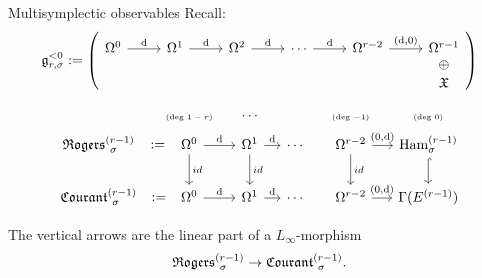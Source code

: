 \documentclass[beamer,10pt]{standalone}
\begin{document}
\begin{frame}{Multisymplectic observables}
	Recall:
	\begin{displaymath}
		\g_{r,\sigma}^{<0} := \left(
		\begin{tikzcd}[ampersand replacement=\&]
			\Omega^0 \ar[r,"\d"]\&
			\Omega^1 \ar[r,"\d"]\&
			\Omega^2 \ar[r,"\d"]\&
			\cdots \ar[r,"\d"]\&
			\Omega^{r-2} \ar[r,"{(\d,0)}"]\&
			\Omega^{r-1}\ar[d,phantom,"\oplus"]\\[-.7em]
			\&\&\&\&\&\X
 		\end{tikzcd}
		\right)
	\end{displaymath}
	\vfill\pause

	\begin{displaymath}
		\begin{tikzcd}[ampersand replacement=\&,column sep = small]
			\& \text{\tiny (deg $1-r$)} \& \cdots \& \&\text{\tiny (deg $-1$)} \& \text{\tiny (deg $0$)} \\[-1.5em]
			\Rogers[\sigma]{r-1}   \ar[r,phantom,":="]
			\&
			\Omega^0 \ar[r,"{\d}"] \ar[d,"id"]
			\&
			\Omega^1 \ar[r,"{\d}"] \ar[d,"id"]
			\&
			\cdots
			\&
			\Omega^{r-2} \ar[r,"{(0,\d)}"] \ar[d,"id"]
			\& \Ham_{\sigma}^{(r-1)} \ar[d,hook]
			\\
			\Courant[\sigma]{r-1} \ar[r,phantom,":="]
			\&
			\Omega^0 \ar[r,"{\d}"]
			\&
			\Omega^1 \ar[r,"{\d}"] 
			\&
			\cdots
			\&
			\Omega^{r-2} \ar[r,"{(0,\d)}"]
			\& \Gamma(E^{(r-1)})
		\end{tikzcd}
	\end{displaymath}
	\vfill\pause

	\begin{thmblock}[{[M.-Zambon 2024]}]
		The vertical arrows are the linear part of a $L_\infty$-morphism $$\Rogers[\sigma]{r-1} \to \Courant[\sigma]{r-1}.$$
	\end{thmblock}
	\vfill
\end{frame}
\end{document}
